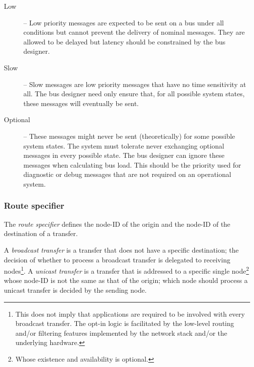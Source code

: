 \begin{remark}[breakable]
\begin{description}
        \item[Low] -- Low priority messages are expected to be sent on a bus under all conditions but cannot
        prevent the delivery of nominal messages.
        They are allowed to be delayed but latency should be constrained by the bus designer.

        \item[Slow] -- Slow messages are low priority messages that have no time sensitivity at all.
        The bus designer need only ensure that, for all possible system states,
        these messages will eventually be sent.

        \item[Optional] -- These messages might never be sent (theoretically) for some possible system states.
        The system must tolerate never exchanging optional messages in every possible state.
        The bus designer can ignore these messages when calculating bus load.
        This should be the priority used for diagnostic or debug messages that are not required on an
        operational system.
    \end{description}
\end{remark}

\subsubsection{Route specifier}\label{sec:transport_route_specifier}

The \emph{route specifier} defines the node-ID of the origin and the node-ID of the destination of a transfer.

A \emph{broadcast transfer} is a transfer that does not have a specific destination;
the decision of whether to process a broadcast transfer is delegated to receiving nodes\footnote{%
    This does not imply that applications are required to be involved with every broadcast transfer.
    The opt-in logic is facilitated by the low-level routing and/or filtering features implemented
    by the network stack and/or the underlying hardware.
}.
A \emph{unicast transfer} is a transfer that is addressed to a specific single node\footnote{%
    Whose existence and availability is optional.
} whose node-ID is not the same as that of the origin;
which node should process a unicast transfer is decided by the sending node.

